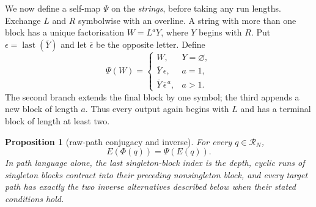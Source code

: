 \documentclass[10pt,a4paper]{amsart}
\newtheorem{proposition}[theorem]{Proposition}
\theoremstyle{definition}
\theoremstyle{remark}
\newcommand{\R}{\mathcal R}
\begin{document}
We now define a self-map $\Psi$ on the \emph{strings}, before taking any run
lengths.  Exchange $L$ and $R$ symbolwise with an overline.  A string with
more than one block has a unique factorisation $W=L^aY$, where $Y$ begins
with $R$.  Put $\epsilon=\operatorname{last}(\overline Y)$ and let
$\overline\epsilon$ be the opposite letter.  Define
\begin{equation}
 \Psi(W)=
 \begin{cases}
 W,&Y=\varnothing,\\
 \overline Y\,\epsilon,&a=1,\\
 \overline Y\,\overline\epsilon^{\,a},&a>1.
 \end{cases}                                           \label{eq:path-map}
\end{equation}
The second branch extends the final block by one symbol; the third appends a
new block of length $a$.  Thus every output again begins with $L$ and has a
terminal block of length at least two.

\begin{proposition}[raw-path conjugacy and inverse]\label{prop:path}
For every $q\in\R_N$,
\begin{equation}
                         E(\Phi(q))=\Psi(E(q)).         \label{eq:conjugacy}
\end{equation}
In path language alone, the last singleton-block index is the depth, cyclic
runs of singleton blocks contract into their preceding nonsingleton block,
and every target path has exactly the two inverse alternatives described
below when their stated conditions hold.
\end{proposition}
\end{document}
